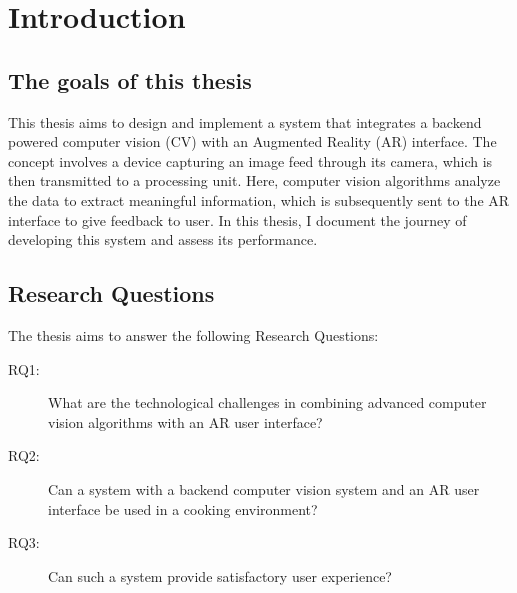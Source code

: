 \chapter{Introduction} \label{intro}

\section{The goals of this thesis} \label{goals}
This thesis aims to design and implement a system that integrates a backend 
powered computer vision (CV) with an Augmented Reality (AR) interface. The concept 
involves a device capturing an image feed through its camera, which is then 
transmitted to a processing unit. Here, computer vision algorithms analyze 
the data to extract meaningful information, which is subsequently sent to the 
AR interface to give feedback to user. In this thesis, I document the journey 
of developing this system and assess its performance.

\section{Research Questions} \label{rq}
The thesis aims to answer the following Research Questions:
\begin{description}
	\item[RQ1:] \label{rq1} What are the technological challenges in 
	combining advanced computer vision algorithms with an AR user interface?

	\item[RQ2:] \label{rq2} Can a system with a backend computer vision 
	system and an AR user interface be used in a cooking environment?

	\item[RQ3:] \label{rq3} Can such a system provide satisfactory user 
	experience?
\end{description}

